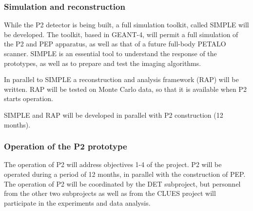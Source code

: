 

\subsubsection*{Simulation and reconstruction}
While the P2 detector is being built, a full simulation toolkit, called SIMPLE will be developed. The toolkit, based in GEANT-4, will permit a full simulation of the P2 and PEP apparatus, as well as that of a future full-body PETALO 
scanner. SIMPLE is an essential tool to understand the response of the prototypes, as well as to prepare and test the imaging algorithms.

In parallel to SIMPLE a reconstruction and analysis framework (RAP) will be written. RAP will be tested on Monte Carlo data, so that it is available when P2 starts operation. 


SIMPLE and RAP will be developed in parallel with P2 construction (12 months).  

\subsubsection*{Operation of the P2 prototype}
The operation of P2 will address objectives 1-4 of the project. P2 will be operated during a period of 12 months, in parallel with the construction of PEP. The operation of P2 will be coordinated by the DET subproject, but personnel from the other two subprojects as well as from the CLUES  project will participate in the experiments and data analysis. 

